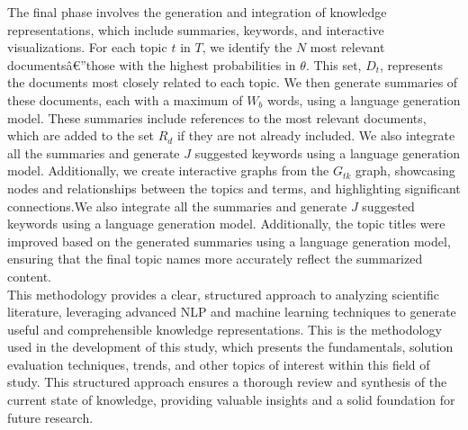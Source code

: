 \documentclass[runningheads]{llncs}
\begin{document}
The final phase involves the generation and integration of knowledge representations, which include summaries, keywords, and interactive visualizations. For each topic $t$ in $T$, we identify the $N$ most relevant documentsâ€”those with the highest probabilities in $\theta$. This set, $D_t$, represents the documents most closely related to each topic. We then generate summaries of these documents, each with a maximum of $W_b$ words, using a language generation model. These summaries include references to the most relevant documents, which are added to the set $R_d$ if they are not already included. We also integrate all the summaries and generate $J$ suggested keywords using a language generation model. Additionally, we create interactive graphs from the $G_{tk}$ graph, showcasing nodes and relationships between the topics and terms, and highlighting significant connections.We also integrate all the summaries and generate $J$ suggested keywords using a language generation model. Additionally, the topic titles were improved based on the generated summaries using a language generation model, ensuring that the final topic names more accurately reflect the summarized content.
\\

This methodology provides a clear, structured approach to analyzing scientific literature, leveraging advanced NLP and machine learning techniques to generate useful and comprehensible knowledge representations. This is the methodology used in the development of this study, which presents the fundamentals, solution evaluation techniques, trends, and other topics of interest within this field of study. This structured approach ensures a thorough review and synthesis of the current state of knowledge, providing valuable insights and a solid foundation for future research.
\end{document}
